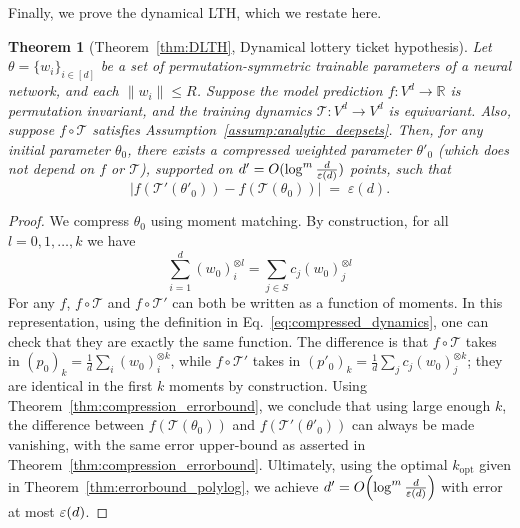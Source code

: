 \documentclass{article}
\theoremstyle{plain}
\newtheorem*{theorem*}{Theorem}
\def\REV#1{{\color[HTML]{000000}#1}}
\begin{document}
Finally, we prove the dynamical LTH, which we restate here. 

\begin{theorem*}[Theorem~\ref{thm:DLTH}, Dynamical lottery ticket hypothesis]
    Let $\theta = \{w_i\}_{i\in[d]}$ be a set of permutation-symmetric trainable parameters of a neural network, and each $\|w_i\| \leq R$. Suppose the model prediction $f: V^d\to \mathbb{R}$ is permutation invariant, and the training dynamics $\mathcal{T}: V^d\to V^d$ is equivariant. Also, suppose $f\circ\mathcal{T}$ satisfies Assumption~\ref{assump:analytic_deepsets}. Then, for any initial parameter $\theta_0$, there exists a compressed weighted parameter $\theta'_0$ \REV{(which does not depend on $f$ or $\mathcal{T}$)}, supported on $d' = O (\log^m \tfrac{d}{\REV{\varepsilon}(d)})$ points, such that
    \begin{equation}
        \big| f(\mathcal{T}'(\theta'_0)) - f(\mathcal{T}(\theta_0)) \big| \;=\; \varepsilon(d) .
    \end{equation}
\end{theorem*}

\begin{proof}
    We compress $\theta_0$ using moment matching. By construction, for all $l = 0,1,\dots, k$ we have
    \begin{equation}
        \sum_{i=1}^d (w_0)_i^{\otimes l}
        = \sum_{j\in S} c_j (w_0)_j^{\otimes l}
    \end{equation}
    For any $f$, $f\circ \mathcal{T}$ and $f\circ\mathcal{T}'$ can both be written as a function of moments. In this representation, using the definition in Eq.~\eqref{eq:compressed_dynamics}, one can check that they are exactly the same function. The difference is that $f\circ\mathcal{T}$ takes in $(p_0)_k = \frac{1}{d} \sum_i (w_0)_i^{\otimes k}$, while $f\circ\mathcal{T}'$ takes in $(p'_0)_k = \frac{1}{d} \sum_j c_j (w_0)_j^{\otimes k}$; they are identical in the first $k$ moments by construction. Using Theorem~\ref{thm:compression_errorbound}, we conclude that using large enough $k$, the difference between $f(\mathcal{T}(\theta_0))$ and $f(\mathcal{T}'(\theta'_0))$ can always be made vanishing, with the same error upper-bound as asserted in Theorem~\ref{thm:compression_errorbound}. Ultimately, using the optimal $k_{\mathrm{opt}}$ given in Theorem~\ref{thm:errorbound_polylog}, we achieve $d' = O\!\left(\log^m \tfrac{d}{\REV{\varepsilon}(d)}\right)$ with error at most $\REV{\varepsilon}(d)$. 
\end{proof}
\end{document}
